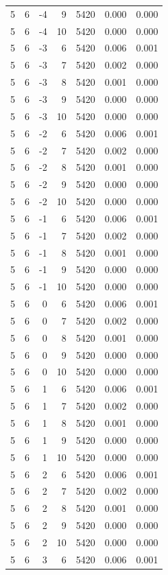 \begin{table}
\begin{tabular}{rrrrrrr}
5 & 6 & -4 & 9 & 5420 & 0.000 & 0.000 \\
5 & 6 & -4 & 10 & 5420 & 0.000 & 0.000 \\
5 & 6 & -3 & 6 & 5420 & 0.006 & 0.001 \\
5 & 6 & -3 & 7 & 5420 & 0.002 & 0.000 \\
5 & 6 & -3 & 8 & 5420 & 0.001 & 0.000 \\
5 & 6 & -3 & 9 & 5420 & 0.000 & 0.000 \\
5 & 6 & -3 & 10 & 5420 & 0.000 & 0.000 \\
5 & 6 & -2 & 6 & 5420 & 0.006 & 0.001 \\
5 & 6 & -2 & 7 & 5420 & 0.002 & 0.000 \\
5 & 6 & -2 & 8 & 5420 & 0.001 & 0.000 \\
5 & 6 & -2 & 9 & 5420 & 0.000 & 0.000 \\
5 & 6 & -2 & 10 & 5420 & 0.000 & 0.000 \\
5 & 6 & -1 & 6 & 5420 & 0.006 & 0.001 \\
5 & 6 & -1 & 7 & 5420 & 0.002 & 0.000 \\
5 & 6 & -1 & 8 & 5420 & 0.001 & 0.000 \\
5 & 6 & -1 & 9 & 5420 & 0.000 & 0.000 \\
5 & 6 & -1 & 10 & 5420 & 0.000 & 0.000 \\
5 & 6 & 0 & 6 & 5420 & 0.006 & 0.001 \\
5 & 6 & 0 & 7 & 5420 & 0.002 & 0.000 \\
5 & 6 & 0 & 8 & 5420 & 0.001 & 0.000 \\
5 & 6 & 0 & 9 & 5420 & 0.000 & 0.000 \\
5 & 6 & 0 & 10 & 5420 & 0.000 & 0.000 \\
5 & 6 & 1 & 6 & 5420 & 0.006 & 0.001 \\
5 & 6 & 1 & 7 & 5420 & 0.002 & 0.000 \\
5 & 6 & 1 & 8 & 5420 & 0.001 & 0.000 \\
5 & 6 & 1 & 9 & 5420 & 0.000 & 0.000 \\
5 & 6 & 1 & 10 & 5420 & 0.000 & 0.000 \\
5 & 6 & 2 & 6 & 5420 & 0.006 & 0.001 \\
5 & 6 & 2 & 7 & 5420 & 0.002 & 0.000 \\
5 & 6 & 2 & 8 & 5420 & 0.001 & 0.000 \\
5 & 6 & 2 & 9 & 5420 & 0.000 & 0.000 \\
5 & 6 & 2 & 10 & 5420 & 0.000 & 0.000 \\
5 & 6 & 3 & 6 & 5420 & 0.006 & 0.001 \\

\end{tabular}
\end{table}
